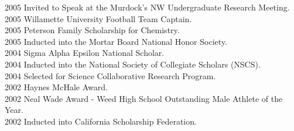 2005 \hspace{58pt} Invited to Speak at the Murdock's NW Undergraduate Research Meeting. \\
2005 \hspace{58pt} Willamette University Football Team Captain. \\
2005 \hspace{58pt} Peterson Family Scholarship for Chemistry. \\
2005 \hspace{58pt} Inducted into the Mortar Board National Honor Society.  \\
2004 \hspace{58pt} Sigma Alpha Epsilon National Scholar.  \\
2004 \hspace{58pt} Inducted into the National Society of Collegiate Scholars (NSCS).  \\
2004 \hspace{58pt} Selected for Science Collaborative Research Program. \\
2002 \hspace{58pt} Haynes McHale Award.  \\
2002 \hspace{58pt} Neal Wade Award - Weed High School Outstanding Male Athlete of the Year. \\
2002 \hspace{58pt} Inducted into California Scholarship Federation.